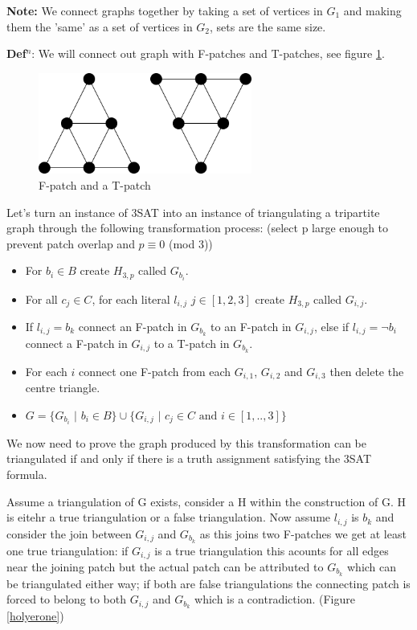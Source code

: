 \documentclass[a4paper,11pt]{report}
\begin{document}
\textbf{Note:} We connect graphs together by taking a set of vertices in $G_1$ and making them the 'same' as a set of vertices in $G_2$, sets are the same size.

\textbf{Def$^n$}: We will connect out graph with F-patches and T-patches, see figure \ref{patches}. 

\begin{figure}[h!]
\begin{center}
		\includegraphics[width=70mm]{figures/patches.png}
\end{center}
		\caption{F-patch and a T-patch}
		\label{patches}
\end{figure}

Let's turn an instance of 3SAT into an instance of triangulating a tripartite graph through the following transformation process: (select p large enough to prevent patch overlap and  $p\equiv 0 $ (mod 3))
\begin{itemize}
\item For $b_i\in B$ create $H_{3,p}$ called $G_{b_i}$.
\item For all $c_j\in C$, for each literal $l_{i,j}$ $j\in [1,2,3]$ create $H_{3,p}$ called $G_{i,j}$.
\item If $l_{i,j}=b_k$ connect an F-patch in $G_{b_k}$ to an F-patch in $G_{i,j}$, else if $l_{i,j}=\neg b_i$ connect a F-patch in $G_{i,j}$ to a T-patch in $G_{b_k}$.
\item For each $i$ connect one F-patch from each $G_{i,1}$, $G_{i,2}$ and $G_{i,3}$ then delete the centre triangle. 
\item $G = \{G_{b_i}$ $|$ $b_i \in B\}\cup\{G_{i,j}$ $|$ $ c_j\in C\text{ and }i\in [1,..,3] \}$
\end{itemize}
We now need to prove the graph produced by this transformation can be triangulated if and only if there is a truth assignment satisfying the 3SAT formula.

Assume a triangulation of G exists, consider a H within the construction of G. H is eitehr a true triangulation or a false triangulation. Now assume $l_{i,j}$ is $b_k$ and consider the join between $G_{i,j}$ and $G_{b_k}$ as this joins two F-patches we get at least one true triangulation: if $G_{i,j}$ is a true triangulation this acounts for all edges near the joining patch but the actual patch can be attributed to $G_{b_k}$ which can be triangulated either way; if both are false triangulations the connecting patch is forced to belong to both $G_{i,j}$ and $G_{b_k}$ which is a contradiction. (Figure \ref{holyerone})
\end{document}
